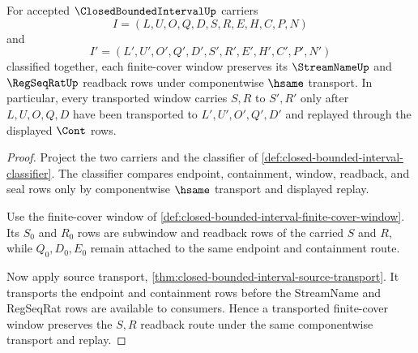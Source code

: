 \begin{theorem}
\label{thm:closed-bounded-interval-regseqrat-window}
For accepted $\ClosedBoundedIntervalUp$ carriers
$$
I=(L,U,O,Q,D,S,R,E,H,C,P,N)
$$
and
$$
I'=(L',U',O',Q',D',S',R',E',H',C',P',N')
$$
classified together, each finite-cover window preserves its $\StreamNameUp$ and $\RegSeqRatUp$ readback rows under componentwise $\hsame$ transport. In particular, every transported window carries $S,R$ to $S',R'$ only after $L,U,O,Q,D$ have been transported to $L',U',O',Q',D'$ and replayed through the displayed $\Cont$ rows.
\end{theorem}
\begin{proof}
Project the two carriers and the classifier of \autoref{def:closed-bounded-interval-classifier}. The classifier compares endpoint, containment, window, readback, and seal rows only by componentwise $\hsame$ transport and displayed replay.

Use the finite-cover window of \autoref{def:closed-bounded-interval-finite-cover-window}. Its $S_0$ and $R_0$ rows are subwindow and readback rows of the carried $S$ and $R$, while $Q_0,D_0,E_0$ remain attached to the same endpoint and containment route.

Now apply source transport, \autoref{thm:closed-bounded-interval-source-transport}. It transports the endpoint and containment rows before the StreamName and RegSeqRat rows are available to consumers. Hence a transported finite-cover window preserves the $S,R$ readback route under the same componentwise transport and replay.
\end{proof}

